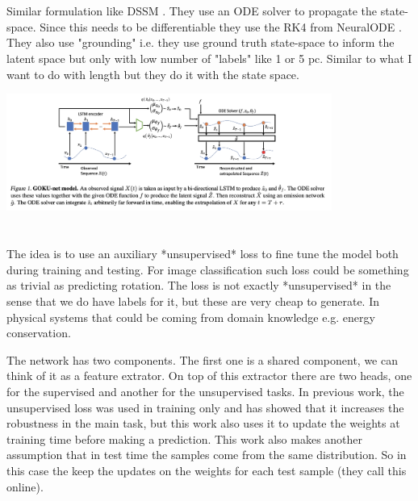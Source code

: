 \documentclass{article}
\newcommand{\citeall}[1]{\citeauthor{#1}}
\begin{document}
\section{\citeall{Linial2020GenerativeUnknowns}}

Similar formulation like DSSM \cite{Miladinovic2019DisentangledRepresentations}. They use an ODE solver to propagate the state-space. Since this needs to be differentiable they use the RK4 from NeuralODE \cite{Chen2018NeuralEquations}. They also use "grounding" i.e. they use ground truth state-space to inform the latent space but only with low number of "labels" like 1 or 5 pc. Similar to what I want to do with length but they do it with the state space.

\includegraphics[width=0.8\textwidth]{images/goku.png}


\section{\citeall{Sun2019Test-TimeShifts}}

The idea is to use an auxiliary *unsupervised* loss to fine tune the model both during training and testing. For image classification such loss could be something as trivial as predicting rotation. The loss is not exactly *unsupervised* in the sense that we do have labels for it, but these are very cheap to generate. In physical systems that could be coming from domain knowledge e.g. energy conservation.

The network has two components. The first one is a shared component, we can think of it as a feature extrator. On top of this extractor there are two heads, one for the supervised and another for the unsupervised tasks. In previous work, the unsupervised loss was used in training only \cite{Hendrycks2019BenchmarkingPerturbations} and has showed that it increases the robustness in the main task, but this work also uses it to update the weights at training time before making a prediction. This work also makes another assumption that in test time the samples come from the same distribution. So in this case the keep the updates on the weights for each test sample (they call this online). 
\end{document}
